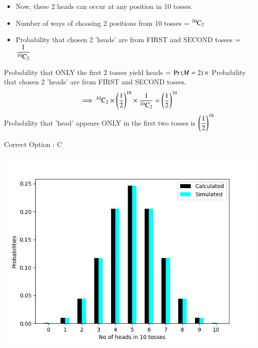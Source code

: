 \documentclass[journal,12pt,twocolumn]{IEEEtran}
\begin{document}
\begin{itemize}
    \item Now, these 2 heads can occur at any position in 10 tosses.
    \item Number of ways of choosing 2 positions from 10 tosses = ${}^{10}\mathrm{C}_{2}$
          \bigskip
    \item Probability that chosen 2 'heads' are from FIRST and SECOND tosses = \(\displaystyle \frac{1}{{}^{10}\mathrm{C}_{2}}\)
          \bigskip
\end{itemize}
Probability that ONLY the first 2 tosses yield heads =  $\Pr\left(M = 2\right) \times$ Probability that chosen 2 'heads' are from FIRST and SECOND tosses.
\bigskip
\begin{align}
    \implies {}^{10}\mathrm{C}_{2} \times \left(\frac{1}{2}\right)^{10} \times \frac{1}{{}^{10}\mathrm{C}_{2}} = \left(\frac{1}{2}\right)^{10}\notag
\end{align}
Probability that 'head' appears ONLY in the first two tosses is $\displaystyle\left(\frac{1}{2}\right)^{10}$
\smallskip
\begin{center}
    Correct Option : C
\end{center}
\pagebreak
\includegraphics{Figure-1.png}
\end{document}
